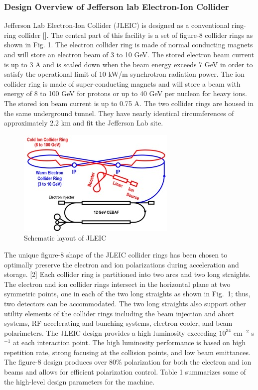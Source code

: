 \subsubsection{Design Overview of Jefferson lab Electron-Ion Collider}
Jefferson Lab Electron-Ion Collider (JLEIC) is designed as a conventional ring-ring collider []. The central part of this facility is a set of figure-8 collider rings as shown in Fig. 1. The electron collider ring is made of normal conducting magnets and will store an electron beam of 3 to 10 GeV. The stored electron beam current is up to 3 A and is scaled down when the beam energy exceeds 7 GeV in order to satisfy the operational limit of 10 kW/m synchrotron radiation power. The ion collider ring is made of super-conducting magnets and will store a beam with energy of 8 to 100 GeV for protons or up to 40 GeV per nucleon for heavy ions. The stored ion beam current is up to 0.75 A. The two collider rings are housed in the same underground tunnel. They have nearly identical circumferences of approximately 2.2 km and fit the Jefferson Lab site.

\begin{figure}
	\centering
	\includegraphics[width=.75\textwidth]{../../img/jleic_schematic2.jpg}
	\caption{Schematic layout of JLEIC}
	\label{fig:jleic1}
\end{figure}

The unique figure-8 shape of the JLEIC collider rings has been chosen to optimally preserve the electron and ion polarizations during acceleration and storage. [2]  Each collider ring is partitioned into two arcs and two long straights. The electron and ion collider rings intersect in the horizontal plane at two symmetric points, one in each of the two long straights as shown in Fig. 1; thus, two detectors can be accommodated. The two long straights also support other utility elements of the collider rings including the beam injection and abort systems, RF accelerating and bunching systems, electron cooler, and beam polarimeters.
The JLEIC design provides a high luminosity exceeding $10^{34}$ cm$^{-2}$ s$^{-1}$ at each interaction point. The high luminosity performance is based on high repetition rate, strong focusing at the collision points, and low beam emittances. The figure-8 design produces over 80\% polarization for both the electron and ion beams and allows for efficient polarization control. Table 1 summarizes some of the high-level design parameters for the machine.

